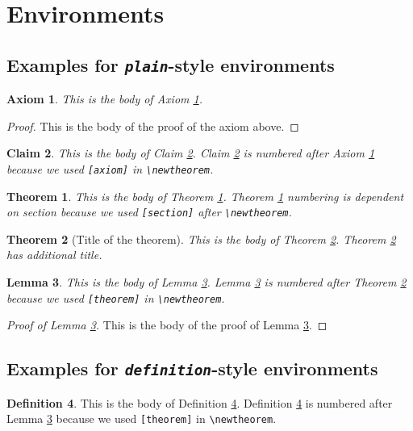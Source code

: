 \documentclass[ps]{imsart}
\theoremstyle{plain}
\newtheorem{axiom}{Axiom}
\newtheorem{claim}[axiom]{Claim}
\newtheorem{theorem}{Theorem}[section]
\newtheorem{lemma}[theorem]{Lemma}
\theoremstyle{definition}
\newtheorem{definition}[theorem]{Definition}
\theoremstyle{remark}
\begin{document}
\section{Environments}

\subsection{Examples for \emph{\texttt{plain}}-style environments}
\begin{axiom}\label{ax1}
This is the body of Axiom \ref{ax1}.
\end{axiom}

\begin{proof}
This is the body of the proof of the axiom above.
\end{proof}

\begin{claim}\label{cl1}
This is the body of Claim \ref{cl1}. Claim \ref{cl1} is numbered after
Axiom \ref{ax1} because we used \verb|[axiom]| in \verb|\newtheorem|.
\end{claim}

\begin{theorem}\label{th1}
This is the body of Theorem \ref{th1}. Theorem \ref{th1} numbering is
dependent on section because we used \verb|[section]| after \verb|\newtheorem|.
\end{theorem}

\begin{theorem}[Title of the theorem]\label{th2}
This is the body of Theorem \ref{th2}. Theorem \ref{th2} has additional title.
\end{theorem}

\begin{lemma}\label{le1}
This is the body of Lemma \ref{le1}. Lemma \ref{le1} is numbered after
Theorem \ref{th2} because we used \verb|[theorem]| in \verb|\newtheorem|.
\end{lemma}


\begin{proof}[Proof of Lemma \ref{le1}]
This is the body of the proof of Lemma \ref{le1}.
\end{proof}

\subsection{Examples for \emph{\texttt{definition}}-style environments}
\begin{definition}\label{de1}
This is the body of Definition \ref{de1}. Definition \ref{de1} is numbered after
Lemma \ref{le1} because we used \verb|[theorem]| in \verb|\newtheorem|.
\end{definition}
\end{document}
